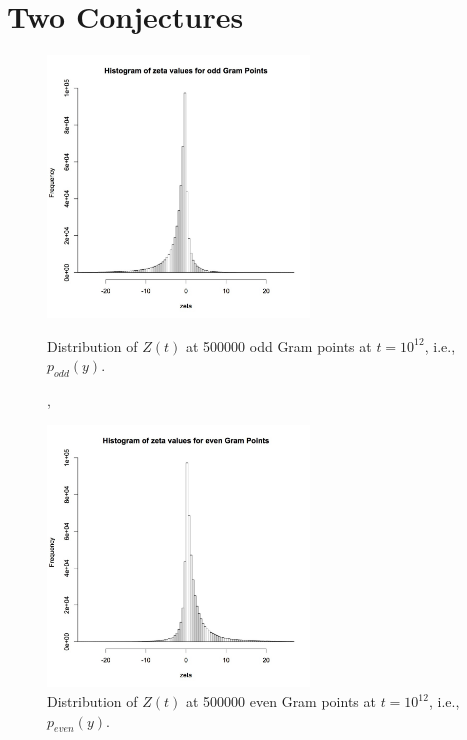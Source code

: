 \documentclass[twoside]{article}
\theoremstyle{definition}
\begin{document}
\section{\label{sec7}Two Conjectures}

\begin{figure}
\centering
\includegraphics[width=0.62\textwidth]{ozeta.jpg}
\caption[]{ 
  Distribution of  $Z(t)$ at 500000 odd Gram points  at $t = 10^{12}$, i.e., $p_{odd}(y)$.
 }
\vspace{1mm}, 
\label{oddhist}

\includegraphics[width=0.62\textwidth]{ezeta.jpg}
\caption[]{ 
   Distribution of $Z(t)$ at 500000 even Gram points  at $t = 10^{12}$, i.e., $p_{even}(y)$.
 }
\label{evenhist}
\vspace{1mm}
\end{figure}
\end{document}
